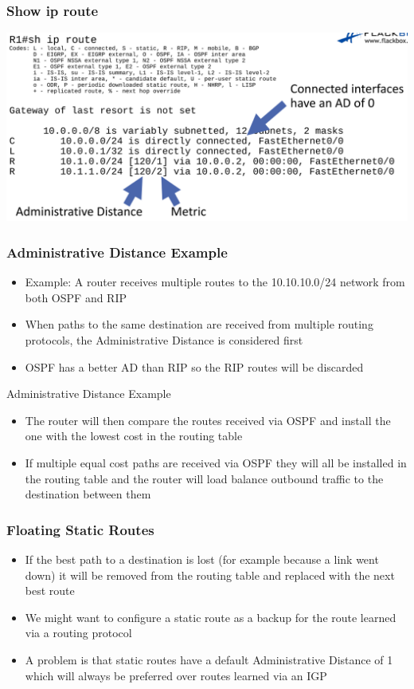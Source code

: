 \documentclass[pdflatex,compress,mathserif]{beamer}
\begin{document}
\begin{frame}
	\frametitle{Show ip route}
	\begin{center}
		\includegraphics[width=\linewidth]{img/img29}
	\end{center}
\end{frame}

\begin{frame}
	\frametitle{Administrative Distance Example}
	\begin{itemize}
		\item Example: A router receives multiple routes to the 10.10.10.0/24 network
from both OSPF and RIP
		\item When paths to the same destination are received from multiple routing
protocols, the Administrative Distance is considered first
		\item OSPF has a better AD than RIP so the RIP routes will be discarded
	\end{itemize}
\end{frame}

\begin{frame}{Administrative Distance Example}
	\begin{itemize}
		\item The router will then compare the routes received via OSPF and install the
one with the lowest cost in the routing table
		\item If multiple equal cost paths are received via OSPF they will all be installed
in the routing table and the router will load balance outbound traffic to
the destination between them
	\end{itemize}
\end{frame}

\begin{frame}
	\frametitle{Floating Static Routes}
	\begin{itemize}
		\item If the best path to a destination is lost (for example because a link went
down) it will be removed from the routing table and replaced with the
next best route
		\item We might want to configure a static route as a backup for the route
learned via a routing protocol
		\item A problem is that static routes have a default Administrative Distance of 1
which will always be preferred over routes learned via an IGP
	\end{itemize}
\end{frame}
\end{document}
